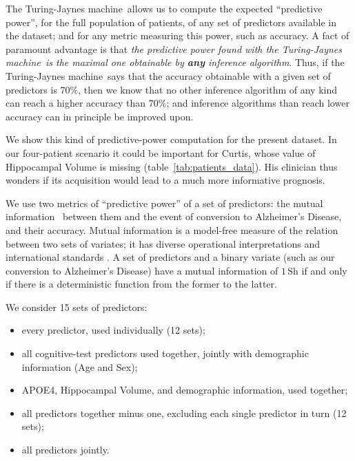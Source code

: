\documentclass[utf8]{FrontiersinHarvard} %
\renewcommand*{\|}[1][]{\nonscript\:#1\vert\nonscript\:\mathopen{}}
\newcommand*{\ad}{Alzheimer's Disease}
\newcommand*{\tjm}{Turing-Jaynes machine}
\begin{document}
The \tjm\ allows us to compute the expected \enquote{predictive power}, for the full population of patients, of any set of predictors available in the dataset; and for any metric measuring this power, such as accuracy. A fact of paramount advantage is that \emph{the predictive power found with the \tjm\ is the maximal one obtainable by \textbf{any} inference algorithm}. Thus, if the \tjm\ says that the accuracy obtainable with a given set of predictors is 70\%, then we know that no other inference algorithm of any kind can reach a higher accuracy than 70\%; and inference algorithms than reach lower accuracy can in principle be improved upon.

We show this kind of predictive-power computation for the present dataset. In our four-patient scenario it could be important for Curtis, whose value of Hippocampal Volume is missing (table~\ref{tab:patients_data}). His clinician thus wonders if its acquisition would lead to a much more informative prognosis.

We use two metrics of \enquote{predictive power} of a set of predictors: the mutual information~\citep{shannon1948,coveretal1991_r2006} between them and the event of conversion to \ad, and their accuracy. Mutual information is a model-free measure of the relation between two sets of variates; it has diverse operational interpretations \citep{mackay1995_r2005,woodward1953_r1964,minka1998d_r2003,goodetal1968,kelly1956,kullback1959_r1978} and international standards \citep{iso2008c}. A set of predictors and a binary variate (such as our conversion to \ad) have a mutual information of $1\,\mathrm{Sh}$ if and only if there is a deterministic function from the former to the latter.

We consider 15 sets of predictors:
\begin{itemize}
\item every predictor, used individually (12 sets);
\item all cognitive-test predictors used together, jointly with demographic information (Age and Sex);
\item APOE4, Hippocampal Volume, and demographic information, used together;
\item all predictors together minus one, excluding each single predictor in turn (12 sets);
\item all predictors jointly.
\end{itemize}
\end{document}
